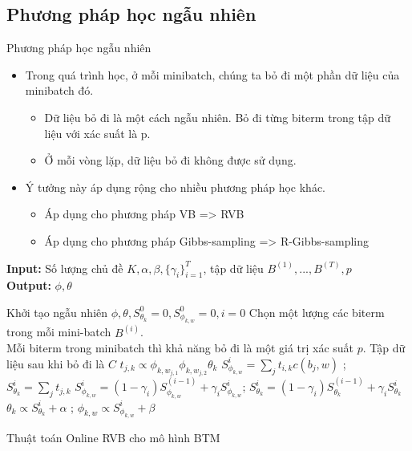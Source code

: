 \documentclass[pdf]{beamer}
\begin{document}
\subsection{Phương pháp học ngẫu nhiên}
\begin{frame}{Phương pháp học ngẫu nhiên}
	\begin{itemize}
		\item Trong quá trình học, ở mỗi minibatch, chúng ta bỏ đi một phần dữ liệu của minibatch đó.
		\begin{itemize}
			\item Dữ liệu bỏ đi là một cách ngẫu nhiên. Bỏ đi từng biterm trong tập dữ liệu với xác suất là p.
			\item Ở mỗi vòng lặp, dữ liệu bỏ đi không được sử dụng.
		\end{itemize}
		\item Ý tưởng này áp dụng rộng cho nhiều phương pháp học khác.
			\begin{itemize}
			\item Áp dụng cho phương pháp VB => RVB
			\item Áp dụng cho phương pháp Gibbs-sampling => R-Gibbs-sampling
		\end{itemize}
	\end{itemize}
\end{frame}
\begin{frame}
\begin{algorithm}[H]
	\textbf{Input: } Số lượng chủ đề $K, \alpha, \beta, \{\gamma_i\}_{i = 1}^T$, tập dữ liệu $B^{(1)}, ..., B^{(T)}, p$  \\
	\textbf{Output: } $\phi, \theta$ 
	\begin{algorithmic}[1]
		\STATE Khởi tạo ngẫu nhiên $\phi, \theta,  S_{\theta_k}^0 = 0, S_{\phi_{k, w}}^0 = 0, i = 0$
		\STATE Chọn một lượng các biterm trong mỗi mini-batch $B^{(i)}$. \\
		Mỗi biterm trong minibatch thì khả năng bỏ đi là một giá trị xác suất $p$. Tập dữ liệu sau khi bỏ đi là $C$
		\STATE $ t_{j, k} \propto {\phi_{k,w_{j,1}} \phi_{k,w_{j,2}} \theta_k}$
		\ENDFOR
		\STATE  $S_{\phi_{k, w}}^i = \sum_{j}{t_{i, k}c(b_j, w)}$ ; \space  $S_{\theta_k}^i = \sum_{j}{t_{j, k}} $
		\STATE$S_{\phi_{k, w}}^i = (1 - \gamma_i) S_{\phi_{k, w}}^{(i-1)} + \gamma_i S_{\phi_{k, w}}^i$; \space $S_{\theta_k}^i = (1 - \gamma_i)S_{\theta_k}^{(i-1)} + \gamma_i S_{\theta_k}^i$
		\STATE $\theta_k \propto S_{\theta_k}^i + \alpha$ ; \space $\phi_{k, w} \propto S_{\phi_{k, w}}^i + \beta $
		\ENDFOR
	\end{algorithmic}
	\caption{Thuật toán Online RVB cho mô hình BTM}
\end{algorithm}
\end{frame}
\end{document}
